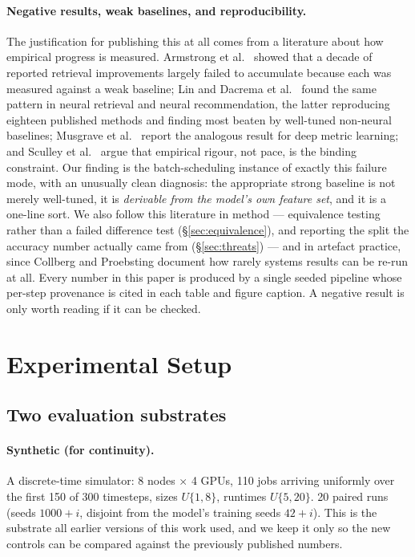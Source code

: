 \documentclass[11pt,twocolumn]{article}
\begin{document}
\paragraph{Negative results, weak baselines, and reproducibility.}
The justification for publishing this at all comes from a literature about how
empirical progress is measured. Armstrong et al.\ \cite{Armstrong2009} showed
that a decade of reported retrieval improvements largely failed to accumulate
because each was measured against a weak baseline; Lin \cite{Lin2018} and
Dacrema et al.\ \cite{Dacrema2019} found the same pattern in neural retrieval
and neural recommendation, the latter reproducing eighteen published methods and
finding most beaten by well-tuned non-neural baselines; Musgrave et al.\
\cite{Musgrave2020} report the analogous result for deep metric learning; and
Sculley et al.\ \cite{Sculley2018} argue that empirical rigour, not pace, is the
binding constraint. Our finding is the batch-scheduling instance of exactly this
failure mode, with an unusually clean diagnosis: the appropriate strong baseline
is not merely well-tuned, it is \emph{derivable from the model's own feature
set}, and it is a one-line sort. We also follow this literature in method ---
equivalence testing rather than a failed difference test
(\S\ref{sec:equivalence}), and reporting the split the accuracy number actually
came from (\S\ref{sec:threats}) --- and in artefact practice, since Collberg and
Proebsting \cite{Collberg2016} document how rarely systems results can be
re-run at all. Every number in this paper is produced by a single seeded
pipeline whose per-step provenance is cited in each table and figure caption.
A negative result is only worth reading if it can be checked.

\section{Experimental Setup}

\subsection{Two evaluation substrates}

\paragraph{Synthetic (for continuity).}
A discrete-time simulator: 8 nodes $\times$ 4 GPUs, 110 jobs arriving uniformly
over the first 150 of 300 timesteps, sizes $U\{1,8\}$, runtimes $U\{5,20\}$. 20
paired runs (seeds $1000{+}i$, disjoint from the model's training seeds
$42{+}i$). This is the substrate all earlier versions of this work used, and we
keep it only so the new controls can be compared against the previously
published numbers.
\end{document}
